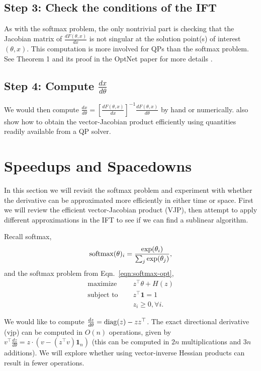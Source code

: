 \documentclass[11pt]{article}
\begin{document}
\subsection*{Step 3: Check the conditions of the IFT}
As with the softmax problem,
the only nontrivial part is checking that the Jacobian matrix of $\frac{dF(\theta,x)}{dx}$ is
not singular at the solution point(s) of interest $(\theta,x)$.
This computation is more involved for QPs than the softmax problem. 
See Theorem 1 and its proof in the OptNet paper for more details \citep{optnet}.

\subsection*{Step 4: Compute $\frac{dx}{d\theta}$}
We would then compute
$\frac{dx}{d\theta} = \left[\frac{dF(\theta,x)}{dx}\right]^{-1}\frac{dF(\theta,x)}{d\theta}$
by hand or numerically.
\citet{optnet} also show how to obtain the vector-Jacobian product efficiently
using quantities readily available from a QP solver.

\section{Speedups and Spacedowns}
In this section we will revisit the softmax problem and experiment with
whether the derivative can be approximated more efficiently in either time or space.
First we will review the efficient vector-Jacobian product (VJP),
then attempt to apply different approximations in the IFT to see if we can
find a sublinear algorithm.

Recall softmax,
$$\mathrm{softmax}(\theta)_i = \frac{\exp(\theta_i)}{\sum_j \exp(\theta_j)},$$
and the softmax problem from Eqn.~\ref{eqn:softmax-opt},
\begin{equation}
\begin{aligned}
\textrm{maximize } \quad & z^\top\theta + H(z)\\
\textrm{subject to } \quad & z^\top \mathbf{1} = 1\\
& z_i \geq 0, \forall i.
\end{aligned}
\end{equation}

We would like to compute $\frac{dz}{d\theta} = \mathrm{diag}(z)-zz^\top$.
The exact directional derivative (vjp) can be computed in $O(n)$ operations,
given by $v^\top \frac{dz}{d\theta} = z \cdot (v - (z^\top v)\mathbf{1}_n)$
(this can be computed in $2n$ multiplications and $3n$ additions).
We will explore whether using vector-inverse Hessian products can result in fewer operations.
\end{document}
